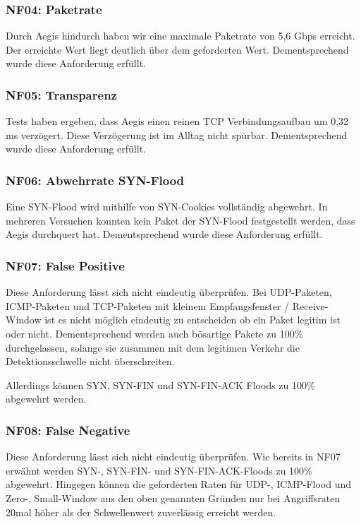\documentclass[../review_3.tex]{subfiles}
\begin{document}
\subsubsection{NF04: Paketrate}
Durch Aegis hindurch haben wir eine maximale Paketrate von 5,6 Gbps erreicht.
Der erreichte Wert liegt deutlich über dem geforderten Wert. Dementsprechend wurde diese Anforderung erfüllt.

\subsubsection{NF05: Transparenz}
Tests haben ergeben, dass Aegis einen reinen TCP Verbindungsaufbau um 0,32 ms verzögert.
Diese Verzögerung ist im Alltag nicht spürbar. Dementsprechend wurde diese Anforderung erfüllt.

\subsubsection{NF06: Abwehrrate SYN-Flood}
Eine SYN-Flood wird mithilfe von SYN-Cookies vollständig abgewehrt. In mehreren Versuchen konnten kein Paket der SYN-Flood festgestellt werden, dass Aegis durchquert hat. Dementsprechend wurde diese Anforderung erfüllt.

\subsubsection{NF07: False Positive}
Diese Anforderung lässt sich nicht eindeutig überprüfen. Bei UDP-Paketen, ICMP-Paketen und TCP-Paketen mit kleinem Empfangsfenster / Receive-Window ist es nicht möglich eindeutig zu entscheiden ob ein Paket legitim ist oder nicht. Dementsprechend werden auch bösartige Pakete zu 100\% durchgelassen, solange sie zusammen mit dem legitimen Verkehr die Detektionsschwelle nicht überschreiten.

Allerdings können SYN, SYN-FIN und SYN-FIN-ACK Floods zu 100\% abgewehrt werden.

\subsubsection{NF08: False Negative}
Diese Anforderung lässt sich nicht eindeutig überprüfen.
Wie bereits in NF07 erwähnt werden SYN-, SYN-FIN- und SYN-FIN-ACK-Floods zu 100\% abgewehrt. Hingegen können die geforderten Raten für UDP-, ICMP-Flood und Zero-, Small-Window aus den oben genannten Gründen nur bei Angriffsraten 20mal höher als der Schwellenwert zuverlässig erreicht werden.
\end{document}
